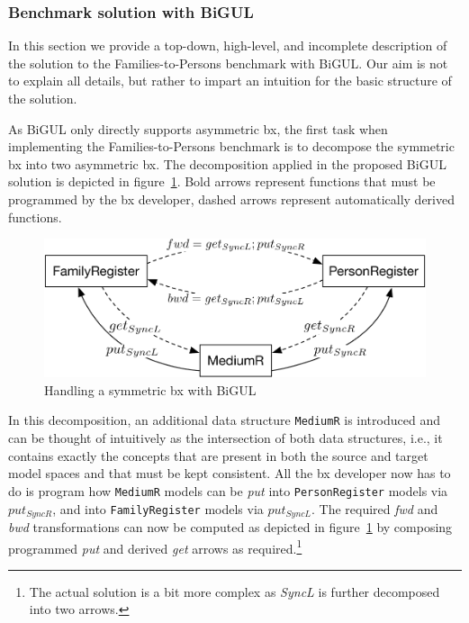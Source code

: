 \subsubsection{Benchmark solution with BiGUL}

In this section we provide a top-down, high-level, and incomplete description of the solution to the Families-to-Persons benchmark with BiGUL.
Our aim is not to explain all details, but rather to impart an intuition for the basic structure of the solution.

As BiGUL only directly supports asymmetric bx, the first task when implementing the Families-to-Persons benchmark is to decompose the symmetric bx into two asymmetric bx.
The decomposition applied in the proposed BiGUL solution is depicted in figure~\ref{fig:bigulSolnOverview}.
Bold arrows represent functions that must be programmed by the bx developer, dashed arrows represent automatically derived functions.
%
\begin{figure}[!tbp]
    \centering
    \includegraphics[width=\columnwidth]{diagrams/solutions/bigulSolnOverview}
    \caption{Handling a symmetric bx with BiGUL}
    \label{fig:bigulSolnOverview}
\end{figure}
%
In this decomposition, an additional data structure \texttt{MediumR} is introduced and can be thought of intuitively as the intersection of both data structures, i.e., it contains exactly the concepts that are present in both the source and target model spaces and that must be kept consistent.
All the bx developer now has to do is program how \texttt{MediumR} models can be \emph{put} into \texttt{Person\-Regis\-ter} models via $put_{SyncR}$, and into \texttt{Family\-Regis\-ter} models via $put_{SyncL}$.
The required \emph{fwd} and \emph{bwd} transformations can now be computed as depicted in figure~\ref{fig:bigulSolnOverview} by composing programmed \emph{put} and derived \emph{get} arrows as required.\footnote{The actual solution is a bit more complex as \emph{SyncL} is further decomposed into two arrows.}

